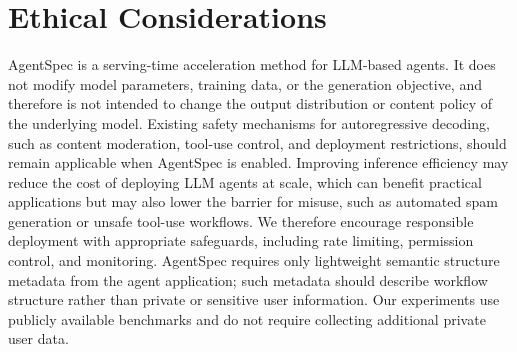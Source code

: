 \section*{Ethical Considerations}
AgentSpec is a serving-time acceleration method for LLM-based agents. It does not modify model parameters, training data, or the generation objective, and therefore is not intended to change the output distribution or content policy of the underlying model. Existing safety mechanisms for autoregressive decoding, such as content moderation, tool-use control, and deployment restrictions, should remain applicable when AgentSpec is enabled. Improving inference efficiency may reduce the cost of deploying LLM agents at scale, which can benefit practical applications but may also lower the barrier for misuse, such as automated spam generation or unsafe tool-use workflows. We therefore encourage responsible deployment with appropriate safeguards, including rate limiting, permission control, and monitoring. AgentSpec requires only lightweight semantic structure metadata from the agent application; such metadata should describe workflow structure rather than private or sensitive user information. Our experiments use publicly available benchmarks and do not require collecting additional private user data.